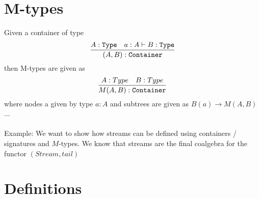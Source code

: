 \documentclass[twoside,11pt,openright]{report}
\begin{document}
\section{M-types}
\label{ch:itree:mtypes}

Given a container of type
\begin{equation}
  \infer{(A,B) : \mathtt{Container}}{A : \mathtt{Type} & a : A \vdash B : \mathtt{Type}}  
\end{equation}
then M-types are given as
\begin{equation}
  \infer{M(A,B) : \mathtt{Container}}{A : Type & B : Type}  
\end{equation}
where nodes a given by type \(a : A\) and subtrees are given as \(B(a) \rightarrow M(A,B)\) ...
\\ \\
Example: We want to show how streams can be defined using containers / signatures and \(M\)-types. We know that streams are the final coalgebra for the functor \((Stream,tail)\)

\section{Definitions}
\label{ch:itree:definitions}
\end{document}

